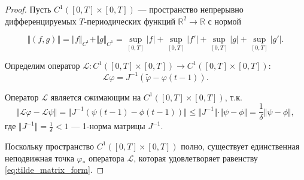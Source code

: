 \begin{proof}
	Пусть $C^1([0, T] \times [0, T])$ --- пространство непрерывно дифференцируемых $T$-периодических функций $\mathbb{R}^2 \to \mathbb{R}$ с нормой
	
	\[\Vert (f, g) \Vert = \Vert f \Vert_{C^1} + \Vert g \Vert_{C^1} = \sup\limits_{[0, T]} |f| + \sup\limits_{[0, T]} |f'| + \sup\limits_{[0, T]} |g| + \sup\limits_{[0, T]} |g'|.\]
	
	Определим оператор $\mathcal{L}:C^1([0, T] \times [0, T]) \to C^1([0, T] \times [0, T])$:
	\[\mathcal{L}\varphi = J^{-1} \left(\tilde{\varphi} - \varphi(t - 1) \right).\]
	
	Оператор $\mathcal{L}$ является сжимающим на $C^1([0, T] \times [0, T])$, т.к.
	\[\Vert\mathcal{L}\varphi - \mathcal{L}\psi\Vert = \Vert J^{-1} (\psi(t - 1) - \phi(t - 1)) \Vert \leq \Vert J^{-1} \Vert \cdot \Vert \psi - \phi \Vert = \dfrac{1}{\delta} \Vert \psi - \phi \Vert,\]
	где $\Vert J^{-1} \Vert = \frac{1}{\delta} < 1$ --- 1-норма матрицы $J^{-1}$.
	
	Поскольку пространство $C^1([0, T] \times [0, T])$ полно, существует единственная неподвижная точка $\varphi_*$ оператора $\mathcal{L}$, которая удовлетворяет равенству \eqref{eq:tilde_matrix_form}.
\end{proof}

